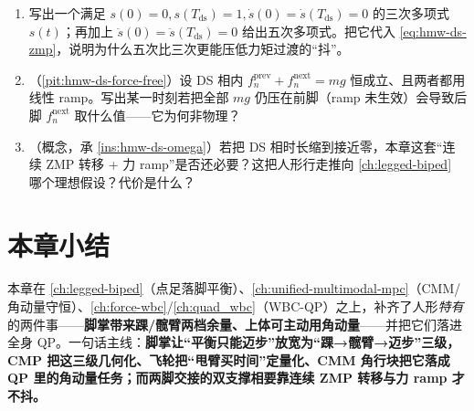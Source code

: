 \begin{practice}
\begin{enumerate}
  \item 写出一个满足 $s(0)=0,s(T_{\mathrm{ds}})=1,\dot s(0)=\dot s(T_{\mathrm{ds}})=0$ 的三次多项式 $s(t)$；再加上 $\ddot s(0)=\ddot s(T_{\mathrm{ds}})=0$ 给出五次多项式。把它代入 \cref{eq:hmw-ds-zmp}，说明为什么五次比三次更能压低力矩过渡的“抖”。
  \item （\cref{pit:hmw-ds-force-free}）设 DS 相内 $f_n^{\mathrm{prev}}+f_n^{\mathrm{next}}=mg$ 恒成立、且两者都用线性 ramp。写出某一时刻若把全部 $mg$ 仍压在前脚（ramp 未生效）会导致后脚 $f_n^{\mathrm{next}}$ 取什么值——它为何非物理？
  \item （概念，承 \cref{ins:hmw-ds-omega}）若把 DS 相时长缩到接近零，本章这套“连续 ZMP 转移 + 力 ramp”是否还必要？这把人形行走推向 \cref{ch:legged-biped} 哪个理想假设？代价是什么？
\end{enumerate}
\end{practice}

\section*{本章小结}

本章在 \cref{ch:legged-biped}（点足落脚平衡）、\cref{ch:unified-multimodal-mpc}（CMM/角动量守恒）、\cref{ch:force-wbc}/\cref{ch:quad_wbc}（WBC-QP）之上，补齐了人形\emph{特有}的两件事——\textbf{脚掌带来踝/髋臂两档余量、上体可主动用角动量}——并把它们落进全身 QP。一句话主线：\textbf{脚掌让“平衡只能迈步”放宽为“踝→髋臂→迈步”三级，CMP 把这三级几何化、飞轮把“甩臂买时间”定量化、CMM 角行块把它落成 QP 里的角动量任务；而两脚交接的双支撑相要靠连续 ZMP 转移与力 ramp 才不抖。}

